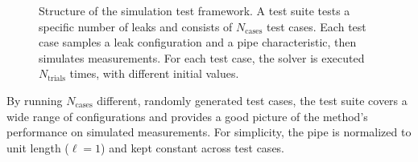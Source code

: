\begin{figure}[h!]
    \centering
    
    \caption[Structure of the simulation test framework]{Structure of the simulation test framework. A test suite tests a specific number of leaks and consists of $N_\text{cases}$ test cases. Each test case samples a leak configuration and a pipe characteristic, then simulates measurements. For each test case, the solver is executed $N_\text{trials}$ times, with different initial values.}
    \label{fig:test-framework}
\end{figure}

\begin{algorithm}[ht]
\caption{Test Suite for $n$ Leaks}
\label{alg:test_suite}

\DontPrintSemicolon
{}
\end{algorithm}

By running $N_\mathrm{cases}$ different, randomly generated test cases, the test suite covers a wide range of configurations and provides a good picture of the method's performance on simulated measurements. For simplicity, the pipe is normalized to unit length ($\ell=1$) and kept constant across test cases.\\

